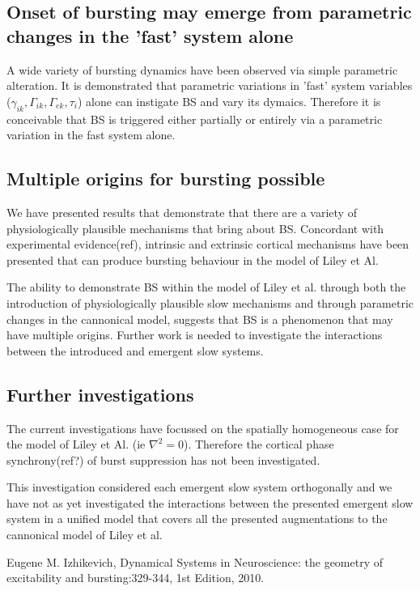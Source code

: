 \documentclass[a4paper,12pt]{article}
\begin{document}
\subsection{Onset of bursting may emerge from parametric changes in the 'fast' system alone}
A wide variety of bursting dynamics have been observed via simple parametric alteration. It is demonstrated that parametric variations in
'fast' system variables ($\gamma_{ik}, \Gamma_{ik}, \Gamma_{ek}, \tau_i$) alone can instigate BS and vary its dymaics. Therefore it is conceivable that BS is triggered either partially or entirely via a parametric variation in the fast system alone.

\subsection{Multiple origins for bursting possible}
We have presented results that demonstrate that there are a variety of physiologically plausible mechanisms that bring about
BS. Concordant with experimental evidence(ref), intrinsic and extrinsic cortical mechanisms have been
presented that can produce bursting behaviour in the model of Liley et Al.

The ability to demonstrate BS within the model of Liley et al. through both the introduction of physiologically
plausible slow mechanisms and through parametric changes in the cannonical model, suggests that BS is a phenomenon that may have multiple origins. Further work is needed to investigate the interactions
between the introduced and emergent slow systems.

\subsection{Further investigations}
The current investigations have focussed on the spatially homogeneous case for the model of Liley et Al. (ie $\nabla^2 =
0$). Therefore the cortical phase synchrony(ref?) of burst suppression has not been investigated.

This investigation considered each emergent slow system orthogonally and we have not as yet investigated the
interactions between the presented emergent slow system in a unified model that covers all the presented augmentations to the cannonical model of Liley et al.


\begin{thebibliography}{999}

  Eugene M. Izhikevich,
  Dynamical Systems in Neuroscience: the geometry of excitability and bursting:329-344,
  1st Edition,
  2010.

\end{thebibliography}
\end{document}
